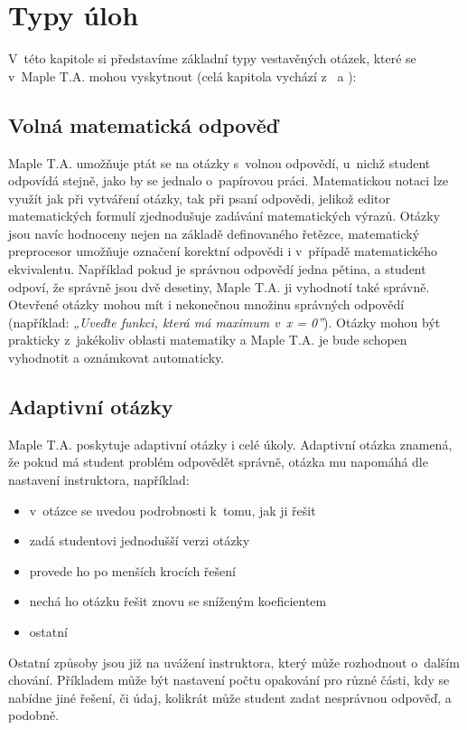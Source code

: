 \documentclass[
print,
  11pt,
  table,   
  nolof,    
  nolot,
  oneside,
  draft
]{fithesis3}
\begin{document}
	\section{Typy úloh} \label{sec:typyuloh}

V~této kapitole si představíme základní typy vestavěných otázek, které se v~Maple T.A. mohou vyskytnout (celá kapitola vychází z~\cite{mapletaquestion} a \cite{char}):

	\subsection{Volná matematická odpověď}
Maple T.A. umožňuje ptát se na otázky s~volnou odpovědí, u~nichž student odpovídá stejně, jako by se jednalo o~papírovou práci. Matematickou notaci lze využít jak při vytváření otázky, tak při psaní odpovědi, jelikož editor matematických formulí zjednodušuje zadávání matematických výrazů. Otázky jsou navíc hodnoceny nejen na základě definovaného řetězce, matematický preprocesor umožňuje označení korektní odpovědi i v~případě matematického ekvivalentu. Například pokud je správnou odpovědí jedna pětina, a student odpoví, že správně jsou dvě desetiny, Maple T.A. ji vyhodnotí také správně. Otevřené otázky mohou mít i nekonečnou množinu správných odpovědí (například: \emph{„Uveďte funkci, která má maximum v~x = 0”}). Otázky mohou být prakticky z~jakékoliv oblasti matematiky a Maple T.A. je bude schopen vyhodnotit a oznámkovat automaticky.


	\subsection{Adaptivní otázky}
Maple T.A. poskytuje adaptivní otázky i celé úkoly. Adaptivní otázka znamená, že pokud má student problém odpovědět správně, otázka mu napomáhá dle nastavení instruktora, například:
\begin{itemize}
	\item v~otázce se uvedou podrobnosti k~tomu, jak ji řešit
	\item zadá studentovi jednodušší verzi otázky
	\item provede ho po menších krocích řešení
	\item nechá ho otázku řešit znovu se sníženým koeficientem
	\item ostatní
\end{itemize}

Ostatní způsoby jsou již na uvážení instruktora, který může rozhodnout o~dalším chování. Příkladem může být nastavení počtu opakování pro různé části, kdy se nabídne jiné řešení, či údaj, kolikrát může student zadat nesprávnou odpověď, a podobně.
\end{document}
